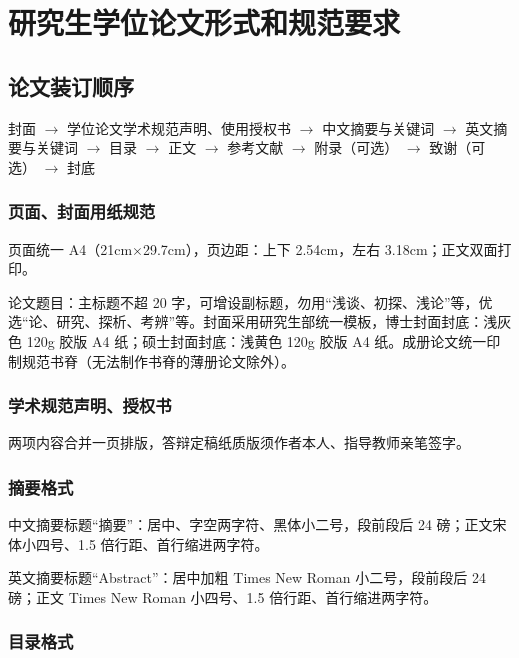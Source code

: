 
\chapter{研究生学位论文形式和规范要求}

\section{论文装订顺序}

封面 $\rightarrow$ 学位论文学术规范声明、使用授权书 $\rightarrow$ 中文摘要与关键词 $\rightarrow$ 英文摘要与关键词 $\rightarrow$ 目录 $\rightarrow$ 正文 $\rightarrow$ 参考文献 $\rightarrow$ 附录（可选） $\rightarrow$ 致谢（可选） $\rightarrow$ 封底

\subsection{页面、封面用纸规范}

页面统一 A4（21cm$\times$29.7cm），页边距：上下 2.54cm，左右 3.18cm；正文双面打印。

论文题目：主标题不超 20 字，可增设副标题，勿用“浅谈、初探、浅论”等，优选“论、研究、探析、考辨”等。封面采用研究生部统一模板，博士封面封底：浅灰色 120g 胶版 A4 纸；硕士封面封底：浅黄色 120g 胶版 A4 纸。成册论文统一印制规范书脊（无法制作书脊的薄册论文除外）。

\subsection{学术规范声明、授权书}

两项内容合并一页排版，答辩定稿纸质版须作者本人、指导教师亲笔签字。

\subsection{摘要格式}

中文摘要标题“摘要”：居中、字空两字符、黑体小二号，段前段后 24 磅；正文宋体小四号、1.5 倍行距、首行缩进两字符。

英文摘要标题“Abstract”：居中加粗 Times New Roman 小二号，段前段后 24 磅；正文 Times New Roman 小四号、1.5 倍行距、首行缩进两字符。

\subsection{目录格式}

